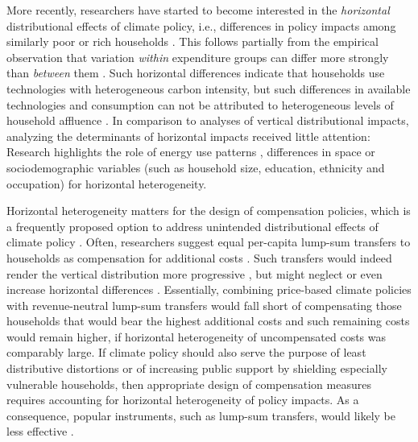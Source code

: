 \documentclass[12pt, a4paper]{article}
\begin{document}
More recently, researchers have started to become interested in the \textit{horizontal} distributional effects of climate policy, i.e., differences in policy impacts among similarly poor or rich households \autocite{Rausch.2011,Fischer.2019}. This follows partially from the empirical observation that variation \textit{within} expenditure groups can differ more strongly than \textit{between} them \autocite{Cronin.2019,Steckel.2021b,Pizer.2019}. Such horizontal differences indicate that households use technologies with heterogeneous carbon intensity, but such differences in available technologies and consumption can not be attributed to heterogeneous levels of household affluence \autocite{Hansel.2022}. In comparison to analyses of vertical distributional impacts, analyzing the determinants of horizontal impacts received little attention: Research highlights the role of energy use patterns \autocite{Steckel.2021b,Missbach.2024}, differences in space \autocite{Chan.2023,Burtraw.2009} or sociodemographic variables (such as household size, education, ethnicity and occupation) \autocite{Grainger.2010,Buchs.2013,Farrell.2017,Missbach.2023,Fremstad.2019} for horizontal heterogeneity.

Horizontal heterogeneity matters for the design of compensation policies, which is a frequently proposed option to address unintended distributional effects of climate policy \autocite{Klenert.2018,Baranzini.2017}. Often, researchers suggest equal per-capita lump-sum transfers to households as compensation for additional costs \autocite{Stiglitz.2017,Baranzini.2000,Metcalf.2009,Sager.2023}. Such transfers would indeed render the vertical distribution more progressive \autocite{Budolfson.2021,vanderPloeg.2022}, but might neglect or even increase horizontal differences \autocite{Cronin.2019,Hansel.2022}. Essentially, combining price-based climate policies with revenue-neutral lump-sum transfers would fall short of compensating those households that would bear the highest additional costs and such remaining costs would remain higher, if horizontal heterogeneity of uncompensated costs was comparably large. If climate policy should also serve the purpose of least distributive distortions \autocite{Fischer.2019} or of increasing public support by shielding especially vulnerable households, then appropriate design of compensation measures requires accounting for horizontal heterogeneity of policy impacts. As a consequence, popular instruments, such as lump-sum transfers, would likely be less effective \autocite{Fullerton.2019,Missbach.2024}. 
\end{document}
